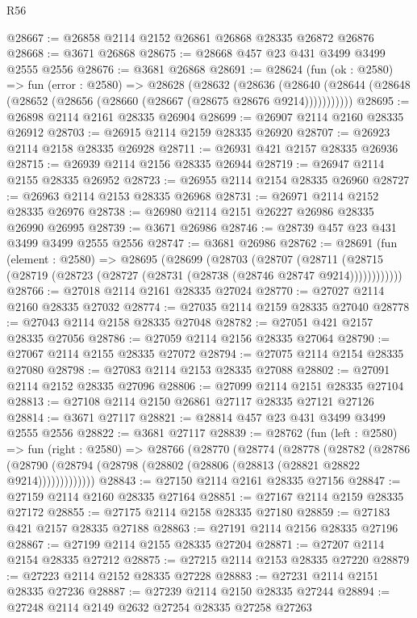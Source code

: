 \begin{lexlean}{R56}
\begin{coremodule}
@28667 := @26858 @2114 @2152 @26861 @26868 @28335 @26872 @26876
@28668 := @3671 @26868
@28675 := @28668 @457 @23 @431 @3499 @3499 @2555 @2556
@28676 := @3681 @26868
@28691 := @28624
    (fun (ok : @2580) =>
    fun (error : @2580) =>
    @28628
      (@28632
        (@28636
          (@28640 (@28644 (@28648 (@28652 (@28656 (@28660 (@28667 (@28675 @28676 @9214)))))))))))
@28695 := @26898 @2114 @2161 @28335 @26904
@28699 := @26907 @2114 @2160 @28335 @26912
@28703 := @26915 @2114 @2159 @28335 @26920
@28707 := @26923 @2114 @2158 @28335 @26928
@28711 := @26931 @421 @2157 @28335 @26936
@28715 := @26939 @2114 @2156 @28335 @26944
@28719 := @26947 @2114 @2155 @28335 @26952
@28723 := @26955 @2114 @2154 @28335 @26960
@28727 := @26963 @2114 @2153 @28335 @26968
@28731 := @26971 @2114 @2152 @28335 @26976
@28738 := @26980 @2114 @2151 @26227 @26986 @28335 @26990 @26995
@28739 := @3671 @26986
@28746 := @28739 @457 @23 @431 @3499 @3499 @2555 @2556
@28747 := @3681 @26986
@28762 := @28691
    (fun (element : @2580) =>
    @28695
      (@28699
        (@28703
          (@28707
            (@28711 (@28715 (@28719 (@28723 (@28727 (@28731 (@28738 (@28746 @28747 @9214))))))))))))
@28766 := @27018 @2114 @2161 @28335 @27024
@28770 := @27027 @2114 @2160 @28335 @27032
@28774 := @27035 @2114 @2159 @28335 @27040
@28778 := @27043 @2114 @2158 @28335 @27048
@28782 := @27051 @421 @2157 @28335 @27056
@28786 := @27059 @2114 @2156 @28335 @27064
@28790 := @27067 @2114 @2155 @28335 @27072
@28794 := @27075 @2114 @2154 @28335 @27080
@28798 := @27083 @2114 @2153 @28335 @27088
@28802 := @27091 @2114 @2152 @28335 @27096
@28806 := @27099 @2114 @2151 @28335 @27104
@28813 := @27108 @2114 @2150 @26861 @27117 @28335 @27121 @27126
@28814 := @3671 @27117
@28821 := @28814 @457 @23 @431 @3499 @3499 @2555 @2556
@28822 := @3681 @27117
@28839 := @28762
    (fun (left : @2580) =>
    fun (right : @2580) =>
    @28766
      (@28770
        (@28774
          (@28778
            (@28782
              (@28786
                (@28790 (@28794 (@28798 (@28802 (@28806 (@28813 (@28821 @28822 @9214)))))))))))))
@28843 := @27150 @2114 @2161 @28335 @27156
@28847 := @27159 @2114 @2160 @28335 @27164
@28851 := @27167 @2114 @2159 @28335 @27172
@28855 := @27175 @2114 @2158 @28335 @27180
@28859 := @27183 @421 @2157 @28335 @27188
@28863 := @27191 @2114 @2156 @28335 @27196
@28867 := @27199 @2114 @2155 @28335 @27204
@28871 := @27207 @2114 @2154 @28335 @27212
@28875 := @27215 @2114 @2153 @28335 @27220
@28879 := @27223 @2114 @2152 @28335 @27228
@28883 := @27231 @2114 @2151 @28335 @27236
@28887 := @27239 @2114 @2150 @28335 @27244
@28894 := @27248 @2114 @2149 @2632 @27254 @28335 @27258 @27263

\end{coremodule}
\end{lexlean}
